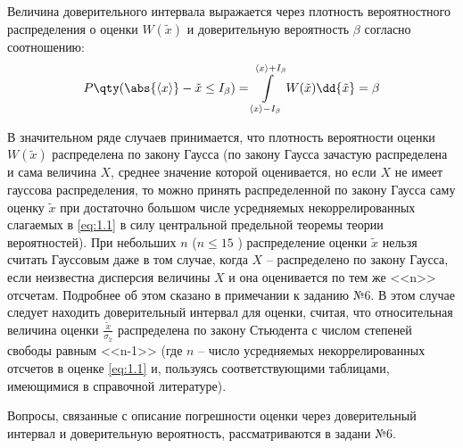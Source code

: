 Величина доверительного интервала выражается через плотность вероятностного распределения о
оценки $W(\tilde x)$ и доверительную вероятность $\beta$ согласно соотношению:
\begin{equation}
    \label{eq:5.1}
    P\qty(\abs{\mean{x}} - \tilde x \leq I_{\beta}) = \int\limits_{\mean{x}-I_{\beta}}^{\mean{x}+I_{\beta}}  W(\tilde x) \dd{\tilde x} = \beta
\end{equation}

В значительном ряде случаев принимается, что плотность вероятности оценки  $W(\tilde x)$ распределена по закону Гаусса (по закону Гаусса зачастую распределена и сама величина $X$,
среднее значение которой оценивается, но если $X$ не имеет гауссова распределения, то 
можно принять распределенной по закону Гаусса саму оценку $\tilde x$  при достаточно большом числе 
усредняемых некоррелированных слагаемых в \eqref{eq:1.1}  в силу центральной предельной теоремы теории вероятностей).
При небольших $n$ ($n\leq 15$ ) распределение оценки $\tilde x$ нельзя считать 
Гауссовым даже в том случае, когда $X$ -- распределено по закону Гаусса, если 
неизвестна дисперсия величины $X$ и она оценивается по тем же <<n>> отсчетам. 
Подробнее об этом сказано в примечании к заданию №6. 
В этом случае следует находить доверительный интервал для оценки, считая, что относительная величина оценки $\frac{\tilde x}{\sigma_{\tilde x}}$ распределена по
закону Стьюдента с числом степеней свободы равным <<n-1>> (где $n$ -- число 
усредняемых некоррелированных отсчетов в оценке \eqref{eq:1.1}  и, пользуясь соответствующими таблицами, имеющимися в справочной литературе).

Вопросы, связанные с описание погрешности оценки через доверительный интервал и доверительную вероятность, рассматриваются в задани  №6.


